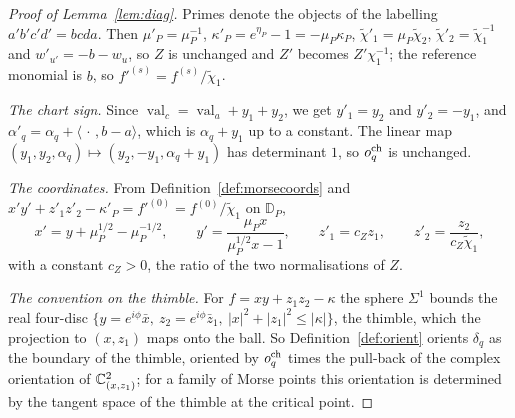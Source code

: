 \begin{proof}[Proof of Lemma~\ref{lem:diag}]
Primes denote the objects of the labelling $a'b'c'd'=bcda$. Then $\mu'_P=\mu_P^{-1}$, $\kappa'_P=e^{\eta_P}-1=-\mu_P\kappa_P$,
$\tilde\chi'_1=\mu_P\tilde\chi_2$, $\tilde\chi'_2=\tilde\chi_1^{-1}$ and $w'_{u'}=-b-w_u$, so $Z$ is unchanged and $Z'$ becomes
$Z'\chi_1^{-1}$; the reference monomial is $b$, so $f'^{(s)}=f^{(s)}/\tilde\chi_1$.

\emph{The chart sign.} Since $\operatorname{val}_c=\operatorname{val}_a+y_1+y_2$, we get $y'_1=y_2$ and $y'_2=-y_1$, and
$\alpha'_q=\alpha_q+\langle\,\cdot\,,b-a\rangle$, which is $\alpha_q+y_1$ up to a constant. The linear map
$(y_1,y_2,\alpha_q)\mapsto(y_2,-y_1,\alpha_q+y_1)$ has determinant $1$, so $o^{\rm ch}_q$ is unchanged.

\emph{The coordinates.} From Definition~\ref{def:morsecoords} and $x'y'+z'_1z'_2-\kappa'_P=f'^{(0)}=f^{(0)}/\tilde\chi_1$ on
$\mathbb D_P$,
\[
x'=y+\mu_P^{1/2}-\mu_P^{-1/2},\qquad y'=\frac{\mu_Px}{\mu_P^{1/2}x-1},\qquad z'_1=c_Zz_1,\qquad z'_2=\frac{z_2}{c_Z\tilde\chi_1},
\]
with a constant $c_Z>0$, the ratio of the two normalisations of $Z$.

\emph{The convention on the thimble.} For $f=xy+z_1z_2-\kappa$ the sphere $\Sigma^1$ bounds the real four-disc
$\{y=e^{i\phi}\bar x,\ z_2=e^{i\phi}\bar z_1,\ |x|^2+|z_1|^2\le|\kappa|\}$, the thimble, which the projection to $(x,z_1)$ maps
onto the ball. So Definition~\ref{def:orient} orients $\delta_q$ as the boundary of the thimble, oriented by $o^{\rm ch}_q$
times the pull-back of the complex orientation of $\mathbb C^2_{(x,z_1)}$; for a family of Morse points this orientation is
determined by the tangent space of the thimble at the critical point.


\end{proof}
